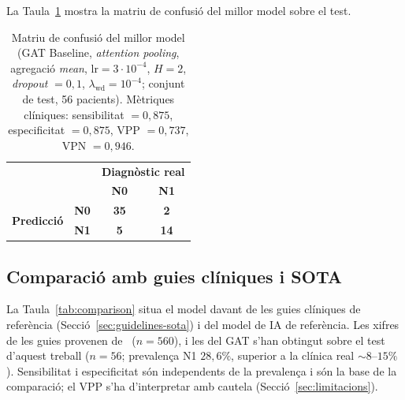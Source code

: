 \documentclass[10pt,a4paper,twocolumn,twoside]{article}
\begin{document}
La Taula~\ref{tab:cm} mostra la matriu de confusió del millor model sobre el test.

\begin{table}[h]
\centering
\caption{Matriu de confusió del millor model (GAT Baseline, \textit{attention pooling},
agregació \textit{mean}, $\text{lr} = 3 \cdot 10^{-4}$, $H = 2$, \textit{dropout} $= 0{,}1$,
$\lambda_{\text{wd}} = 10^{-4}$; conjunt de test, 56 pacients).
Mètriques clíniques: sensibilitat $= 0{,}875$, especificitat $= 0{,}875$,
VPP $= 0{,}737$, VPN $= 0{,}946$.}
\label{tab:cm}
\small
\begin{tabular}{llcc}
\toprule
 & & \multicolumn{2}{c}{\textbf{Diagnòstic real}} \\
 & & \textbf{N0} & \textbf{N1} \\
\midrule
\multirow{2}{*}{\textbf{Predicció}}
  & \textbf{N0} & \textbf{35} & \textbf{2} \\
  & \textbf{N1} & \textbf{5}  & \textbf{14} \\
\bottomrule
\end{tabular}
\end{table}

\subsection{Comparació amb guies clíniques i SOTA}
\label{sec:resultats-comparacio}

La Taula~\ref{tab:comparison} situa el model davant de les guies clíniques de
referència (Secció~\ref{sec:guidelines-sota}) i del model de IA de referència.
Les xifres de les guies provenen de~\cite{tanino2024comparative} ($n\!=\!560$),
i les del GAT s'han obtingut sobre el test d'aquest treball ($n\!=\!56$;
prevalença N1 $28{,}6\%$, superior a la clínica real $\sim\!8$–$15\%$
\cite{zaffalon2023}). Sensibilitat i especificitat són independents de la
prevalença i són la base de la comparació; el VPP s'ha d'interpretar amb
cautela (Secció~\ref{sec:limitacions}).
\end{document}
